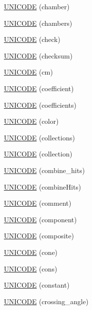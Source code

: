 \begin{DoxyCompactItemize}
\item 
\hyperlink{namespace_d_d4hep_1_1_x_m_l_ab274d20a64d529882b50d0d945f0b805}{UNICODE} (chamber)
\item 
\hyperlink{namespace_d_d4hep_1_1_x_m_l_a99ab5779948f25c8ee910b070f6ecb23}{UNICODE} (chambers)
\item 
\hyperlink{namespace_d_d4hep_1_1_x_m_l_a7161a93c1987ffc580d2f9f4fb4595a0}{UNICODE} (check)
\item 
\hyperlink{namespace_d_d4hep_1_1_x_m_l_ab5dce0c9214c49dd9ca34dcf32ba705b}{UNICODE} (checksum)
\item 
\hyperlink{namespace_d_d4hep_1_1_x_m_l_abcb9f224c739bb6fe5fba75a17bdc7fa}{UNICODE} (cm)
\item 
\hyperlink{namespace_d_d4hep_1_1_x_m_l_abcd7b7f159f83d6bc4b58e541fe93e65}{UNICODE} (coefficient)
\item 
\hyperlink{namespace_d_d4hep_1_1_x_m_l_a85267280422f2a419836796e52ee004c}{UNICODE} (coefficients)
\item 
\hyperlink{namespace_d_d4hep_1_1_x_m_l_a6824b3eb8b25483b4378bfec45dc4c43}{UNICODE} (color)
\item 
\hyperlink{namespace_d_d4hep_1_1_x_m_l_a126c380ca9d4874360e355444af84a16}{UNICODE} (collections)
\item 
\hyperlink{namespace_d_d4hep_1_1_x_m_l_a81a5be6fb130ad33fc6d9de6167a164b}{UNICODE} (collection)
\item 
\hyperlink{namespace_d_d4hep_1_1_x_m_l_afcba8763ae22bcb136e542df4a675961}{UNICODE} (combine\_\-hits)
\item 
\hyperlink{namespace_d_d4hep_1_1_x_m_l_af27bc0e0d5d74830c24df020c5c3f9af}{UNICODE} (combineHits)
\item 
\hyperlink{namespace_d_d4hep_1_1_x_m_l_af29147620c371649c7ac11e1ccb6f793}{UNICODE} (comment)
\item 
\hyperlink{namespace_d_d4hep_1_1_x_m_l_a92f6052499293d0e156273bda2b44c3c}{UNICODE} (component)
\item 
\hyperlink{namespace_d_d4hep_1_1_x_m_l_a75b17b68963b5127df7e5e66bc496df0}{UNICODE} (composite)
\item 
\hyperlink{namespace_d_d4hep_1_1_x_m_l_a64329346b285d17ed4eced10c746a380}{UNICODE} (cone)
\item 
\hyperlink{namespace_d_d4hep_1_1_x_m_l_a5d361e9f15792828cd571e4f7f02c745}{UNICODE} (cons)
\item 
\hyperlink{namespace_d_d4hep_1_1_x_m_l_a44ae68f8355a2198dd8d202ef478b21a}{UNICODE} (constant)
\item 
\hyperlink{namespace_d_d4hep_1_1_x_m_l_abe108ea0fd616f2ab19be533684554f3}{UNICODE} (crossing\_\-angle)

\end{DoxyCompactItemize}
